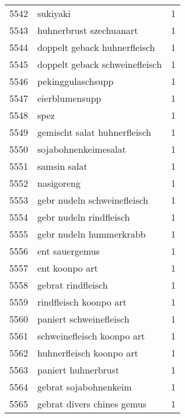 \begin{tabular}{llr}
5542 &                                           sukiyaki &      1 \\
5543 &                            huhnerbrust szechuanart &      1 \\
5544 &                       doppelt geback huhnerfleisch &      1 \\
5545 &                     doppelt geback schweinefleisch &      1 \\
5546 &                                  pekinggulaschsupp &      1 \\
5547 &                                     eierblumensupp &      1 \\
5548 &                                               spez &      1 \\
5549 &                       gemischt salat huhnerfleisch &      1 \\
5550 &                               sojabohnenkeimesalat &      1 \\
5551 &                                       samsin salat &      1 \\
5552 &                                         nasigoreng &      1 \\
5553 &                        gebr nudeln schweinefleisch &      1 \\
5554 &                            gebr nudeln rindfleisch &      1 \\
5555 &                            gebr nudeln hummerkrabb &      1 \\
5556 &                                     ent sauergemus &      1 \\
5557 &                                     ent koonpo art &      1 \\
5558 &                                 gebrat rindfleisch &      1 \\
5559 &                             rindfleisch koonpo art &      1 \\
5560 &                            paniert schweinefleisch &      1 \\
5561 &                         schweinefleisch koonpo art &      1 \\
5562 &                           huhnerfleisch koonpo art &      1 \\
5563 &                                paniert huhnerbrust &      1 \\
5564 &                              gebrat sojabohnenkeim &      1 \\
5565 &                         gebrat divers chines gemus &      1 \\

\end{tabular}
